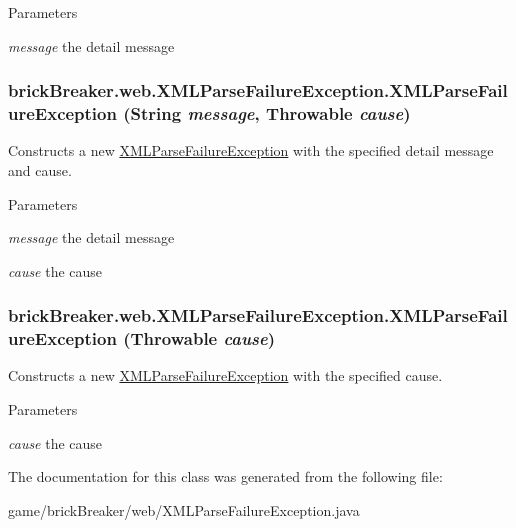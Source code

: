 \begin{DoxyParams}{Parameters}
\item[{\em message}]the detail message \end{DoxyParams}
\hypertarget{classbrick_breaker_1_1web_1_1_x_m_l_parse_failure_exception_a481f9e2823e591526dddb632a3cb8ab7}{
\subsubsection[{XMLParseFailureException}]{\setlength{\rightskip}{0pt plus 5cm}brickBreaker.web.XMLParseFailureException.XMLParseFailureException (String {\em message}, \/  Throwable {\em cause})}}
\label{classbrick_breaker_1_1web_1_1_x_m_l_parse_failure_exception_a481f9e2823e591526dddb632a3cb8ab7}
Constructs a new {\ttfamily \hyperlink{classbrick_breaker_1_1web_1_1_x_m_l_parse_failure_exception}{XMLParseFailureException}} with the specified detail message and cause.


\begin{DoxyParams}{Parameters}
\item[{\em message}]the detail message \item[{\em cause}]the cause \end{DoxyParams}
\hypertarget{classbrick_breaker_1_1web_1_1_x_m_l_parse_failure_exception_aa07904b5ff321a28d6ed9669236fa98b}{
\subsubsection[{XMLParseFailureException}]{\setlength{\rightskip}{0pt plus 5cm}brickBreaker.web.XMLParseFailureException.XMLParseFailureException (Throwable {\em cause})}}
\label{classbrick_breaker_1_1web_1_1_x_m_l_parse_failure_exception_aa07904b5ff321a28d6ed9669236fa98b}
Constructs a new {\ttfamily \hyperlink{classbrick_breaker_1_1web_1_1_x_m_l_parse_failure_exception}{XMLParseFailureException}} with the specified cause.


\begin{DoxyParams}{Parameters}
\item[{\em cause}]the cause \end{DoxyParams}


The documentation for this class was generated from the following file:\begin{DoxyCompactItemize}
\item 
game/brickBreaker/web/XMLParseFailureException.java\end{DoxyCompactItemize}
